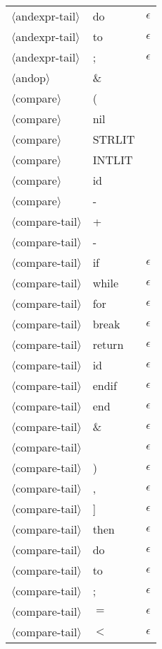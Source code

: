 \documentclass[11pt, fleqn]{article}
\newcommand{\atag}[1]{$\langle$#1$\rangle$}
\begin{document}
\begin{longtable}{l|l|l}
\atag{andexpr-tail}				&	do			&	$\epsilon$	\\
\atag{andexpr-tail}				&	to			&	$\epsilon$	\\
\atag{andexpr-tail}				&	;			&	$\epsilon$	\\
\atag{andop}						&	\&			&											\\
\atag{compare} 					&	(			&		\\
\atag{compare} 					&	nil			&		\\
\atag{compare} 					&	STRLIT		&		\\
\atag{compare} 					&	INTLIT		&		\\
\atag{compare} 					&	id			&		\\
\atag{compare} 					&	-			&		\\
\atag{compare-tail}				&	+			&						\\
\atag{compare-tail}				&	-			&						\\
\atag{compare-tail}				&	if			&	$\epsilon$					\\
\atag{compare-tail}				&	while			&	$\epsilon$					\\
\atag{compare-tail}				&	for			&	$\epsilon$					\\
\atag{compare-tail}				&	break			&	$\epsilon$					\\
\atag{compare-tail}				&	return			&	$\epsilon$					\\
\atag{compare-tail}				&	id			&	$\epsilon$					\\
\atag{compare-tail}				&	endif			&	$\epsilon$					\\
\atag{compare-tail}				&	end			&	$\epsilon$					\\
\atag{compare-tail}				&	\&			&	$\epsilon$					\\
\atag{compare-tail}				&	\textbar			&	$\epsilon$					\\
\atag{compare-tail}				&	)			&	$\epsilon$					\\
\atag{compare-tail}				&	,			&	$\epsilon$					\\
\atag{compare-tail}				&	]			&	$\epsilon$					\\
\atag{compare-tail}				&	then			&	$\epsilon$					\\
\atag{compare-tail}				&	do			&	$\epsilon$					\\
\atag{compare-tail}				&	to			&	$\epsilon$					\\
\atag{compare-tail}				&	;			&	$\epsilon$					\\
\atag{compare-tail}				&	$=$			&	$\epsilon$					\\
\atag{compare-tail}				&	$<$			&	$\epsilon$					\\

\end{longtable}
\end{document}
